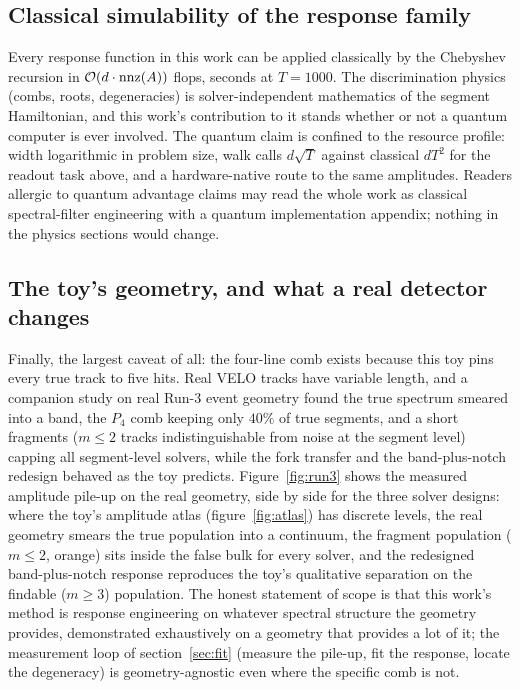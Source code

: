 \documentclass[11pt,a4paper]{article}
\begin{document}
\subsection{Classical simulability of the response family}
\label{sec:limits:dequant}

Every response function in this work can be applied classically by
the Chebyshev recursion in $\mathcal{O}(d\cdot{\rm nnz}(A))$ flops,
seconds at $T=1000$. The discrimination physics (combs, roots,
degeneracies) is solver-independent mathematics of the segment
Hamiltonian, and this work's contribution to it stands whether or
not a quantum computer is ever involved. The quantum claim is
confined to the resource profile: width logarithmic in problem
size, walk calls $d\sqrt T$ against classical $dT^2$ for the
readout task above, and a hardware-native route to the same
amplitudes. Readers allergic to quantum advantage claims may read the whole work as classical spectral-filter engineering with a
quantum implementation appendix; nothing in the physics sections
would change.

\subsection{The toy's geometry, and what a real detector changes}
\label{sec:limits:geometry}

Finally, the largest caveat of all: the four-line comb exists
because this toy pins every true track to five hits. Real VELO
tracks have variable length, and a companion study on real Run-3
event geometry found the true spectrum smeared into a band, the
$P_4$ comb keeping only $40\%$ of true segments, and a
short fragments ($m\le2$ tracks indistinguishable from noise
at the segment level) capping all segment-level solvers, while the
fork transfer and the band-plus-notch redesign behaved as the toy
predicts. Figure~\ref{fig:run3} shows the measured amplitude
pile-up on the real geometry, side by side for the three solver
designs: where the toy's amplitude atlas (figure~\ref{fig:atlas})
has discrete levels, the real geometry smears the true population
into a continuum, the fragment population ($m\le2$, orange) sits
inside the false bulk for every solver, and the redesigned
band-plus-notch response reproduces the toy's qualitative
separation on the findable ($m\ge3$) population. The honest
statement of scope is that this work's method
is response engineering on whatever spectral structure the geometry
provides, demonstrated exhaustively on a geometry that provides a
lot of it; the measurement loop of section~\ref{sec:fit} (measure
the pile-up, fit the response, locate the degeneracy) is
geometry-agnostic even where the specific comb is not.
\end{document}
